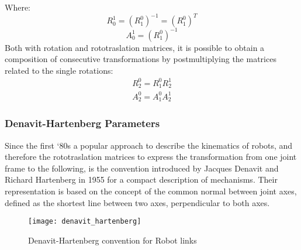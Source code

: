 Where:
\begin{equation*}	
	R_0^1 = (R_1^0)^{-1}=(R_1^0)^{T}
\end{equation*}
\begin{equation*}
A_0^1 = (R_1^0)^{-1}
\end{equation*}
Both with rotation and rototraslation matrices, it is possible to obtain a composition of consecutive transformations by postmultiplying the matrices related to the single rotations:
\begin{align}
	R_2^0 = R_1^0R_2^1\\
	A_2^0 = A_1^0A_2^1	
\end{align}

\subsubsection{Denavit-Hartenberg Parameters}
Since the first ‘80s a popular approach to describe the kinematics of robots, and therefore the rototraslation matrices to express the transformation from one joint frame to the following, is the convention introduced by Jacques Denavit and Richard Hartenberg in 1955 for a compact description of mechanisms.  
Their representation is based on the concept of the common normal between joint axes, defined as the shortest line between two axes, perpendicular to both axes. 

\begin{figure}[h!]
	\centering
	\texttt{[image: denavit\_hartenberg]}
	\caption{Denavit-Hartenberg convention for Robot links}
\end{figure}

